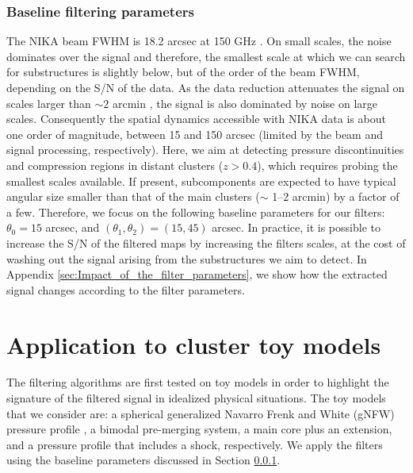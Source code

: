 \documentclass[traditabstract]{aa}
\begin{document}
\subsubsection{Baseline filtering parameters}\label{sec:Baseline_filtering_parameters}
The NIKA beam FWHM is 18.2 arcsec at 150 GHz \citep{Catalano2014}. On small scales, the noise dominates over the signal and therefore, the smallest scale at which we can search for substructures is slightly below, but of the order of the beam FWHM, depending on the S/N of the data. As the data reduction attenuates the signal on scales larger than $\sim 2$ arcmin \citep[see][and Sect. \ref{sec:Systematics_and_noise_properties}]{Adam2015}, the signal is also dominated by noise on large scales. Consequently the spatial dynamics accessible with NIKA data is about one order of magnitude, between 15 and 150 arcsec (limited by the beam and signal processing, respectively). Here, we aim at detecting pressure discontinuities and compression regions in distant clusters ($z>0.4$), which requires probing the smallest scales available. If present, subcomponents are expected to have typical angular size smaller than that of the main clusters ($\sim$ 1--2 arcmin) by a factor of a few. Therefore, we focus on the following baseline parameters for our filters: $\theta_0 = 15$ arcsec, and $\left(\theta_1, \theta_2\right) = \left(15, 45\right)$ arcsec. In practice, it is possible to increase the S/N of the filtered maps by increasing the filters scales, at the cost of washing out the signal arising from the substructures we aim to detect. In Appendix \ref{sec:Impact_of_the_filter_parameters}, we show how the extracted signal changes according to the filter parameters.

\section{Application to cluster toy models}\label{sec:Application_to_toy_models}
The filtering algorithms are first tested on toy models in order to highlight the signature of the filtered signal in idealized physical situations. The toy models that we consider are: a spherical generalized Navarro Frenk and White (gNFW) pressure profile \citep{Nagai2007}, a bimodal pre-merging system, a main core plus an extension, and a pressure profile that includes a shock, respectively. We apply the filters using the baseline parameters discussed in Section \ref{sec:Baseline_filtering_parameters}.
\end{document}
